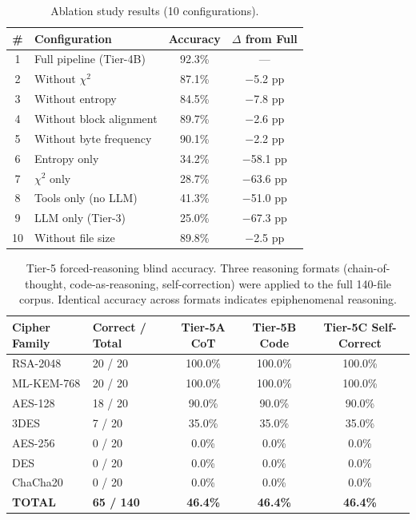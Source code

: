 \begin{table}[htbp]
\centering
\caption{Ablation study results (10 configurations).}
\label{tab:ablation}
\begin{tabular}{clcc}
\toprule
\textbf{\#} & \textbf{Configuration} & \textbf{Accuracy} & \textbf{$\Delta$ from Full} \\
\midrule
1 & Full pipeline (Tier-4B) & 92.3\% & — \\
2 & Without $\chi^2$ & 87.1\% & $-$5.2 pp \\
3 & Without entropy & 84.5\% & $-$7.8 pp \\
4 & Without block alignment & 89.7\% & $-$2.6 pp \\
5 & Without byte frequency & 90.1\% & $-$2.2 pp \\
6 & Entropy only & 34.2\% & $-$58.1 pp \\
7 & $\chi^2$ only & 28.7\% & $-$63.6 pp \\
8 & Tools only (no LLM) & 41.3\% & $-$51.0 pp \\
9 & LLM only (Tier-3) & 25.0\% & $-$67.3 pp \\
10 & Without file size & 89.8\% & $-$2.5 pp \\
\bottomrule
\end{tabular}
\end{table}

\begin{table}[htbp]
\centering
\caption{Tier-5 forced-reasoning blind accuracy. Three reasoning formats (chain-of-thought, code-as-reasoning, self-correction) were applied to the full 140-file corpus. Identical accuracy across formats indicates epiphenomenal reasoning.}
\label{tab:tier5}
\begin{tabular}{llccc}
\toprule
\textbf{Cipher Family} & \textbf{Correct / Total} & \textbf{Tier-5A CoT} & \textbf{Tier-5B Code} & \textbf{Tier-5C Self-Correct} \\
\midrule
RSA-2048 & 20 / 20 & 100.0\% & 100.0\% & 100.0\% \\
ML-KEM-768 & 20 / 20 & 100.0\% & 100.0\% & 100.0\% \\
AES-128 & 18 / 20 & 90.0\% & 90.0\% & 90.0\% \\
3DES & 7 / 20 & 35.0\% & 35.0\% & 35.0\% \\
AES-256 & 0 / 20 & 0.0\% & 0.0\% & 0.0\% \\
DES & 0 / 20 & 0.0\% & 0.0\% & 0.0\% \\
ChaCha20 & 0 / 20 & 0.0\% & 0.0\% & 0.0\% \\
\midrule
\textbf{TOTAL} & \textbf{65 / 140} & \textbf{46.4\%} & \textbf{46.4\%} & \textbf{46.4\%} \\
\bottomrule
\end{tabular}
\end{table}

